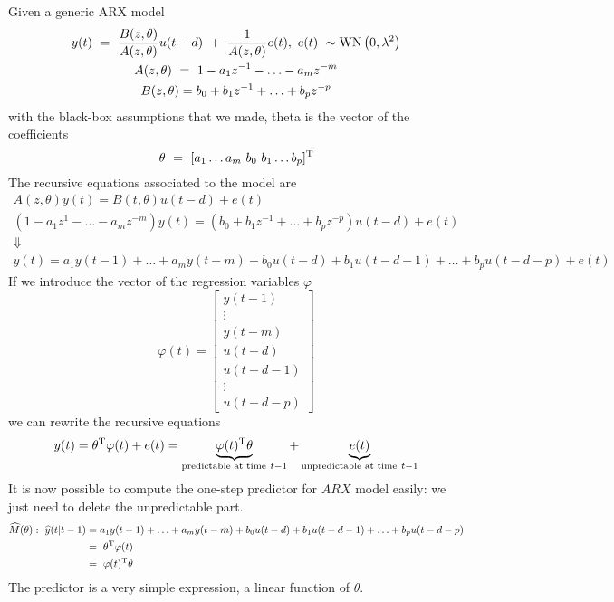 Given a generic ARX model
\begin{gather*}
y(t) \ =\ \frac{B(z,\theta)}{A(z,\theta)} u(t-d) \ +\ \frac{1}{A(z,\theta)} e(t) ,\ e(t) \ \sim \WN\left(0,\lambda ^{2}\right)\\
A(z,\theta) \ =\ 1-a_{1} z^{-1} -\dotsc -a_{m} z^{-m}\\
B(z,\theta) =b_{0} +b_{1} z^{-1} +\dotsc +b_{p} z^{-p}
\end{gather*}
with the black-box assumptions that we made, theta is the vector of the coefficients
\begin{equation*}
\theta \ =\ [ a_{1} \dotsc a_{m} \ b_{0} \ b_{1} \dotsc b_{p}]^{\mathrm{T}}
\end{equation*}
The recursive equations associated to the model are
\begin{gather*}
A(z,\theta) y(t) =B(t,\theta) u(t-d) +e(t)\\
\left(1-a_{1} z^{1} -\dotsc -a_{m} z^{-m}\right) y(t) =\left(b_{0} +b_{1} z^{-1} +\dotsc +b_{p} z^{-p}\right) u(t-d) +e(t)\\
\Downarrow \\
y(t) =a_{1} y(t-1) +\dotsc +a_{m} y(t-m) +b_{0} u(t-d) +b_{1} u(t-d-1) +\dotsc +b_{p} u(t-d-p) +e(t)
\end{gather*}
If we introduce the vector of the regression variables $ \varphi $
\begin{equation*}
\varphi (t) =\begin{bmatrix}
y(t-1)\\
\vdots \\
y(t-m)\\
u(t-d)\\
u(t-d-1)\\
\vdots \\
u(t-d-p)
\end{bmatrix}
\end{equation*}
we can rewrite the recursive equations
\begin{equation*}
y(t) =\theta ^{\mathrm{T}} \varphi (t) +e(t) =\underbrace{\varphi (t)^{\mathrm{T}} \theta }_{\text{predictable at time} \ t-1} +\underbrace{e(t)}_{\text{unpredictable at time} \ t-1}
\end{equation*}
It is now possible to compute the one-step predictor for $ ARX$ model easily: we just need to delete the unpredictable part.
\begin{align*}
\widehat{M}(\theta) :\ \widehat{y}(t|t-1) & =a_{1} y(t-1) +\dotsc +a_{m} y(t-m) +b_{0} u(t-d) +b_{1} u(t-d-1) +\dotsc +b_{p} u(t-d-p)\\
 & =\ \theta ^{\mathrm{T}} \varphi (t) \ \\
 & =\ \varphi (t)^{\mathrm{T}} \theta 
\end{align*}
The predictor is a very simple expression, a linear function of $ \theta $.

